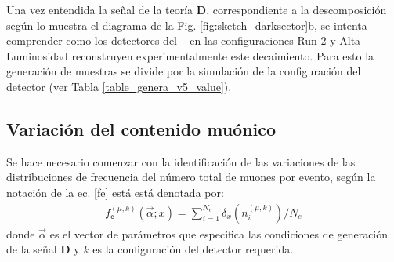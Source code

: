 
Una vez entendida la señal de la teoría \MSSM\textbf{D}, correspondiente a la descomposición según lo muestra el diagrama de la Fig. \ref{fig:sketch_darksector}b, se intenta comprender como los detectores del \CMS ~ en las configuraciones Run-2 y Alta Luminosidad reconstruyen experimentalmente este decaimiento. Para esto la generación de muestras se divide por la simulación de la configuración del detector (ver Tabla \ref{table_genera_v5_value}).

\subsection{Variación del contenido muónico}

Se hace necesario comenzar con la identificación de las variaciones de las distribuciones de frecuencia del número total de muones por evento, según la notación de la ec. \ref{fe} está está denotada por:
\begin{eqnarray}
f^{(\mu, k)}_\textsf{e} (\vec{\alpha}; x) = \sum_{i=1}^{N_e} \delta_{x}(n_i^{(\mu,k)})/N_e
\end{eqnarray}
donde $\vec{\alpha}$ es el vector de parámetros que especifica las condiciones de generación de la señal \MSSM\textbf{D} y $k$ es la configuración del detector requerida.

